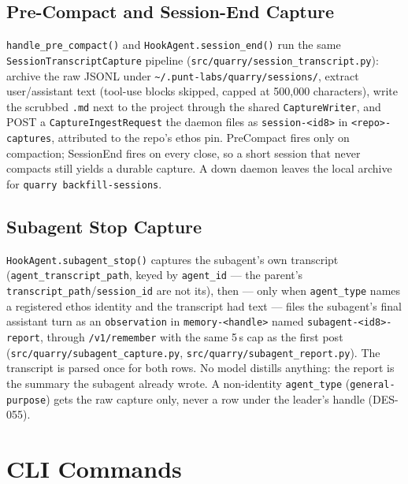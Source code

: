 \documentclass[a4paper,10pt]{article}
\newcommand{\modpath}[1]{\texttt{src/quarry/#1}}
\begin{document}
\subsection{Pre-Compact and Session-End Capture}

\texttt{handle\_pre\_compact()} and \texttt{HookAgent.session\_end()} run
the same \texttt{SessionTranscriptCapture} pipeline
(\modpath{session\_transcript.py}): archive the raw JSONL under
\texttt{\~{}/.punt-labs/quarry/sessions/}, extract user/assistant text
(tool-use blocks skipped, capped at 500{,}000 characters), write the
scrubbed \texttt{.md} next to the project through the shared
\texttt{CaptureWriter}, and POST a \texttt{CaptureIngestRequest} the daemon
files as \texttt{session-<id8>} in \texttt{<repo>-captures}, attributed to
the repo's ethos pin.  PreCompact fires only on compaction; SessionEnd
fires on every close, so a short session that never compacts still yields
a durable capture.  A down daemon leaves the local archive for
\texttt{quarry backfill-sessions}.

\subsection{Subagent Stop Capture}

\texttt{HookAgent.subagent\_stop()} captures the subagent's own transcript
(\texttt{agent\_transcript\_path}, keyed by \texttt{agent\_id} --- the
parent's \texttt{transcript\_path}/\texttt{session\_id} are not its), then
--- only when \texttt{agent\_type} names a registered ethos identity and
the transcript had text --- files the subagent's final assistant turn as
an \texttt{observation} in \texttt{memory-<handle>} named
\texttt{subagent-<id8>-report}, through \texttt{/v1/remember} with the
same 5\,s cap as the first post (\modpath{subagent\_capture.py},
\modpath{subagent\_report.py}).  The transcript is parsed once for both
rows.  No model distills anything: the report is the summary the subagent
already wrote.  A non-identity \texttt{agent\_type}
(\texttt{general-purpose}) gets the raw capture only, never a row under
the leader's handle (DES-055).

\section{CLI Commands}
\end{document}
